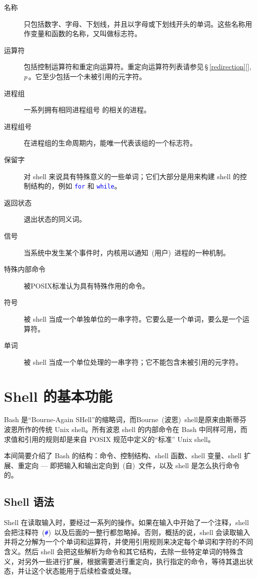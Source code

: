 \documentclass[openany,notitlepage]{book}
\newcommand{\code}[1]{\textcolor{blue}{{\tt #1}}}
\newcommand{\fullref}[1]{\,\S\,\ref{#1}[\nameref{#1}], \textit{p\pageref{#1}}\,}
\begin{document}
\begin{CJK}{UTF8}{song}
\begin{description}
    \item[名称] 只包括数字、字母、下划线，并且以字母或下划线开头的单词。这些名称用作变量和函数的名称，又叫做标志符。
    \item[运算符] 包括控制运算符和重定向运算符。重定向运算符列表请参见\fullref{redirection}。它至少包括一个未被引用的元字符。
    \item[进程组] 一系列拥有相同进程组号 的相关的进程。
    \item[进程组号] 在进程组的生命周期内，能唯一代表该组的一个标志符。
    \item[保留字] 对 shell 来说具有特殊意义的一些单词；它们大部分是用来构建 shell 的控制结构的，例如 \code{for} 和 \code{while}。
    \item[返回状态] 退出状态的同义词。
    \item[信号] 当系统中发生某个事件时，内核用以通知~(用户)~进程的一种机制。
    \item[特殊内部命令] 被POSIX标准认为具有特殊作用的命令。
    \item[符号] 被 shell 当成一个单独单位的一串字符。它要么是一个单词，要么是一个运算符。
    \item[单词] 被 shell 当成一个单位处理的一串字符；它不能包含未被引用的元字符。
\end{description}

\chapter{Shell 的基本功能} %
Bash 是``Bourne-Again SHell''的缩略词，而Bourne~(波恩)~shell是原来由斯蒂芬\textbullet 波恩所作的传统 Unix shell。所有波恩 shell 的内部命令在 Bash 中同样可用，而求值和引用的规则却是来自 POSIX 规范中定义的``标准'' Unix shell。

本间简要介绍了 Bash 的结构：命令、控制结构、shell 函数、shell 变量、shell 扩展、重定向 --- 即把输入和输出定向到~(自)~文件，以及 shell 是怎么执行命令的。

\section{Shell 语法} %
Shell 在读取输入时，要经过一系列的操作。如果在输入中开始了一个注释，shell 会把注释符~(\code{\#})~以及后面的一整行都忽略掉。否则，概括的说，shell 会读取输入并将之分解为一个个单词和运算符，并使用引用规则来决定每个单词和字符的不同含义。然后 shell 会把这些解析为命令和其它结构，去除一些特定单词的特殊含义，对另外一些进行扩展，根据需要进行重定向，执行指定的命令，等待其退出状态，并让这个状态能用于后续检查或处理。


\end{CJK}
\end{document}
